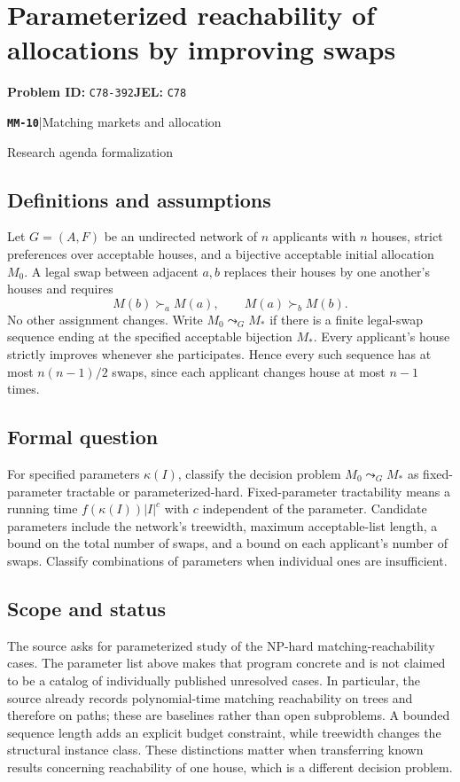 \documentclass[11pt,a4paper]{article}
\newcommand{\entrymeta}[3]{{\sffamily\small\color{muted}\textbf{\texttt{#1}}\quad|\quad #2\par #3\par}}
\begin{document}
\section*{Parameterized reachability of allocations by improving swaps}
\textbf{Problem ID:} \texttt{C78-392}\quad \textbf{JEL:} \texttt{C78}\par
\label{problem:OP-0551}
\label{beyond:MM-10}
\entrymeta{MM-10}{Matching markets and allocation}{Research agenda formalization}
\subsection*{Definitions and assumptions}
Let $G=(A,F)$ be an undirected network of $n$ applicants with $n$ houses, strict preferences over acceptable houses, and a bijective acceptable initial allocation $M_0$. A legal swap between adjacent $a,b$ replaces their houses by one another's houses and requires
\[
 M(b)\succ_a M(a),\qquad M(a)\succ_b M(b).
\]
No other assignment changes. Write $M_0\leadsto_G M_*$ if there is a finite legal-swap sequence ending at the specified acceptable bijection $M_*$. Every applicant's house strictly improves whenever she participates. Hence every such sequence has at most $n(n-1)/2$ swaps, since each applicant changes house at most $n-1$ times.
\subsection*{Formal question}
For specified parameters $\kappa(I)$, classify the decision problem $M_0\leadsto_G M_*$ as fixed-parameter tractable or parameterized-hard. Fixed-parameter tractability means a running time $f(\kappa(I))|I|^c$ with $c$ independent of the parameter. Candidate parameters include the network's treewidth, maximum acceptable-list length, a bound on the total number of swaps, and a bound on each applicant's number of swaps. Classify combinations of parameters when individual ones are insufficient.
\subsection*{Scope and status}
The source asks for parameterized study of the NP-hard matching-reachability cases. The parameter list above makes that program concrete and is not claimed to be a catalog of individually published unresolved cases. In particular, the source already records polynomial-time matching reachability on trees and therefore on paths; these are baselines rather than open subproblems. A bounded sequence length adds an explicit budget constraint, while treewidth changes the structural instance class. These distinctions matter when transferring known results concerning reachability of one house, which is a different decision problem.
\end{document}
